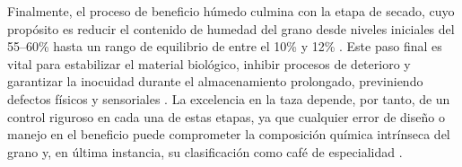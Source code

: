 Finalmente, el proceso de beneficio húmedo culmina con la etapa de secado, cuyo propósito es reducir el contenido de humedad del grano desde niveles iniciales del 55--60\% hasta un rango de equilibrio de entre el 10\% y 12\% \parencite{barbosa_sensory_2019, de_bruyn_exploring_2017, osorio_hernandez_simulation_2015}. Este paso final es vital para estabilizar el material biológico, inhibir procesos de deterioro y garantizar la inocuidad durante el almacenamiento prolongado, previniendo defectos físicos y sensoriales \parencite{osorio_hernandez_simulation_2015}. La excelencia en la taza depende, por tanto, de un control riguroso en cada una de estas etapas, ya que cualquier error de diseño o manejo en el beneficio puede comprometer la composición química intrínseca del grano y, en última instancia, su clasificación como café de especialidad \parencite{escuela_superior_politecnica_agropecuaria_de_manabi_manuel_felix_lopez_carrera_de_ingenieria_agricola_postharvest_2023, ferreira_bernardes_pereira_influence_2020, osorio_hernandez_computational_2020}.


